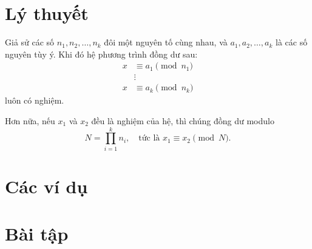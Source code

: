\documentclass[../../imo-training-open-book.tex]{subfiles}
\begin{document}
\section{Lý thuyết}

\begin{theorem*}
    \label{theorem:chinese-remainder-theorem}
    Giả sử các số \( n_1, n_2, \dots, n_k \) đôi một nguyên tố cùng nhau, và \( a_1, a_2, \dots, a_k \) là các số nguyên tùy ý. Khi đó hệ phương trình đồng dư sau:
    \[
        \begin{aligned}
            x &\equiv a_1 \pmod{n_1} \\
            &\vdots \\
            x &\equiv a_k \pmod{n_k}
        \end{aligned}
    \]
    luôn có nghiệm.

    Hơn nữa, nếu \( x_1 \) và \( x_2 \) đều là nghiệm của hệ, thì chúng đồng dư modulo
    \[
        N = \prod_{i=1}^k n_i, \quad \text{tức là } x_1 \equiv x_2 \pmod{N}.
    \]
\end{theorem*}

\newpage

\section{Các ví dụ}

 \newpage
 \newpage
 \newpage
 \newpage
 \newpage
 \newpage
 \newpage
 \newpage

\section{Bài tập}


 

\newpage
\end{document}
